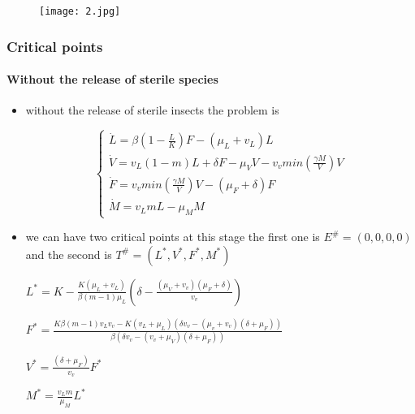 \documentclass[light]{lutbeamer} %
\begin{document}
\begin{frame}[fragile]
\begin{itemize}[<+->]
 {\item {\begin{figure}[h!]
\texttt{[image: 2.jpg]}
\end{figure}}}


\end{itemize}
\end{frame}


\begin{frame}[fragile]
\frametitle{Critical points}
\framesubtitle{Without the release of sterile species}
\begin{itemize}[<+->]
\item without the release of sterile insects the problem is 

$$\left\{\begin{array}{l}
\dot{L} =\beta\left(1-\frac{L}{K}\right) F-\left(\mu_L+v_L\right) L \\ \dot{V}=v_L(1-m) L +\delta F-\mu_V V - v_v min(\frac{\gamma M}{V} )V\\  \dot{F}= v_v min(\frac{\gamma M}{V} )V-(\mu_F+\delta) F  \\  \dot{M} =v_L m L-\mu_M M 
\end{array}\right.$$

\item we can have two critical points at this stage the first one is $E^\# =(0,0,0,0)$ and the second is $T^\#=(L^*,V^*,F^*,M^*)$

$L^*=K-\frac{K(\mu_L+v_L)}{\beta(m-1)\mu_L}(\delta-\frac{(\mu_V+v_v)(\mu_F+\delta)}{v_v})$

$F^*=\frac{K\beta (m-1)v_Lv_v-K(v_L+\mu_L)(\delta v_v-(\mu_v + v_v)(\delta + \mu_F))}{\beta(\delta v_v-(v_v+\mu_V)(\delta + \mu_F))}$

$V^*= \frac{(\delta+\mu_F)}{v_v}F^*$ 

$M^* =\frac{v_L m}{\mu_M } L^*$

\end{itemize}

\end{frame}
\end{document}
